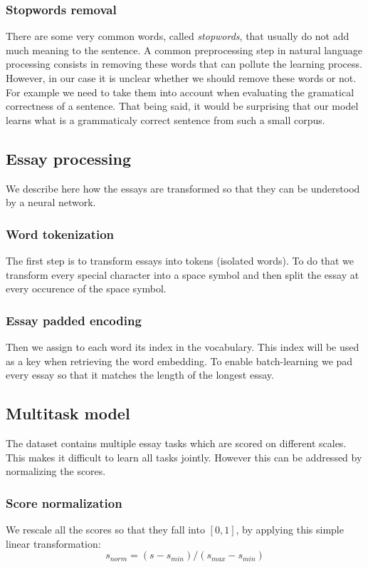 \documentclass[a4paper,12pt,english]{article}
\begin{document}
\subsubsection{Stopwords removal}
There are some very common words, called \emph{stopwords}, that usually do not add much meaning to the sentence.
A common preprocessing step in natural language processing consists in removing these words that can pollute the learning process.
However, in our case it is unclear whether we should remove these words or not.
For example we need to take them into account when evaluating the gramatical correctness of a sentence.
That being said, it would be surprising that our model learns what is a grammaticaly correct sentence from such a small corpus.

\subsection{Essay processing}
We describe here how the essays are transformed so that they can be understood by a neural network.
\subsubsection{Word tokenization}
The first step is to transform essays into tokens (isolated words).
To do that we transform every special character into a space symbol and then split the essay at every occurence of the space symbol.
\subsubsection{Essay padded encoding}
Then we assign to each word its index in the vocabulary. This index will be used as a key when retrieving the word embedding.
To enable batch-learning we pad every essay so that it matches the length of the longest essay.

\subsection{Multitask model}
The dataset contains multiple essay tasks which are scored on different scales.
This makes it difficult to learn all tasks jointly.
However this can be addressed by normalizing the scores.
\subsubsection{Score normalization}
We rescale all the scores so that they fall into $[0,1]$, by applying this simple linear transformation:
\begin{equation}
s_{norm} = (s - s_{min}) / (s_{max} - s_{min})
\end{equation}
\end{document}

